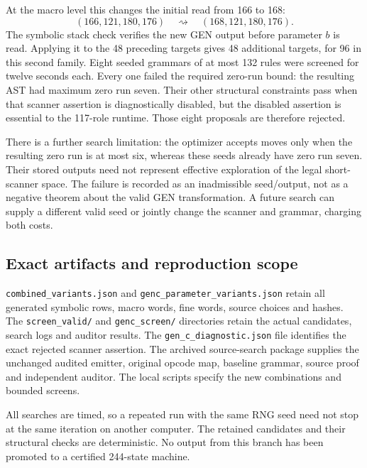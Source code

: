 At the macro level this changes the initial read from 166 to 168:
\[
 (166,121,180,176)\quad\rightsquigarrow\quad
 (168,121,180,176).
\]
The symbolic stack check verifies the new GEN output before parameter
$b$ is read. Applying it to the 48 preceding targets gives 48 additional
targets, for 96 in this second family. Eight seeded grammars of at most
132 rules were screened for twelve seconds each. Every one failed the
required zero-run bound: the resulting AST had maximum zero run seven.
Their other structural constraints pass when that scanner assertion is
diagnostically disabled, but the disabled assertion is essential to the
117-role runtime. Those eight proposals are therefore rejected.

There is a further search limitation: the optimizer accepts moves only
when the resulting zero run is at most six, whereas these seeds already
have zero run seven. Their stored outputs need not represent effective
exploration of the legal short-scanner space. The failure is recorded as
an inadmissible seed/output, not as a negative theorem about the valid
GEN transformation. A future search can supply a different valid seed
or jointly change the scanner and grammar, charging both costs.

\subsection{Exact artifacts and reproduction scope}

\texttt{combined\_variants.json} and
\texttt{genc\_parameter\_variants.json} retain all generated symbolic
rows, macro words, fine words, source choices and hashes. The
\texttt{screen\_valid/} and \texttt{genc\_screen/} directories retain
the actual candidates, search logs and auditor results. The
\texttt{gen\_c\_diagnostic.json} file identifies the exact rejected
scanner assertion. The archived source-search package supplies the
unchanged audited emitter, original opcode map, baseline grammar,
source proof and independent auditor. The local scripts specify the
new combinations and bounded screens.

All searches are timed, so a repeated run with the same RNG seed need
not stop at the same iteration on another computer. The retained
candidates and their structural checks are deterministic. No output
from this branch has been promoted to a certified 244-state machine.
